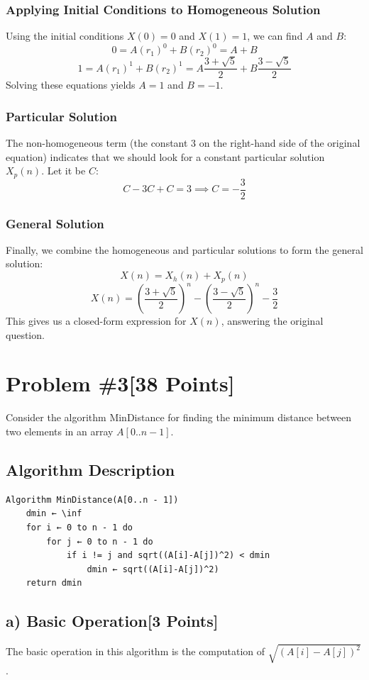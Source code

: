 \documentclass[12pt]{article}
\begin{document}
\subsubsection*{Applying Initial Conditions to Homogeneous Solution}
Using the initial conditions \( X(0) = 0 \) and \( X(1) = 1 \), we can find \( A \) and \( B \):
\[
0 = A(r_1)^0 + B(r_2)^0 = A + B
\]
\[
1 = A(r_1)^1 + B(r_2)^1 = A \frac{3 + \sqrt{5}}{2} + B \frac{3 - \sqrt{5}}{2}
\]
Solving these equations yields \( A = 1 \) and \( B = -1 \).

\subsubsection*{Particular Solution}
The non-homogeneous term (the constant 3 on the right-hand side of the original equation) indicates that we should look for a constant particular solution \( X_p(n) \). Let it be \( C \):
\[
C - 3C + C = 3 \implies C = -\frac{3}{2}
\]

\subsubsection*{General Solution}
Finally, we combine the homogeneous and particular solutions to form the general solution:
\[
X(n) = X_h(n) + X_p(n)
\]
\[
X(n) = \left( \frac{3 + \sqrt{5}}{2} \right)^n - \left( \frac{3 - \sqrt{5}}{2} \right)^n - \frac{3}{2}
\]
This gives us a closed-form expression for \( X(n) \), answering the original question.

\newpage

\section*{Problem \#3[38 Points]}
Consider the algorithm MinDistance for finding the minimum distance between two elements in an array \(A[0..n-1]\).

\subsection*{Algorithm Description}
\begin{verbatim}
Algorithm MinDistance(A[0..n - 1])
    dmin ← \inf
    for i ← 0 to n - 1 do
        for j ← 0 to n - 1 do
            if i != j and sqrt((A[i]-A[j])^2) < dmin
                dmin ← sqrt((A[i]-A[j])^2)
    return dmin
\end{verbatim}

\subsection*{a) Basic Operation[3 Points]}
The basic operation in this algorithm is the computation of \( \sqrt{(A[i]-A[j])^2} \).
\end{document}
